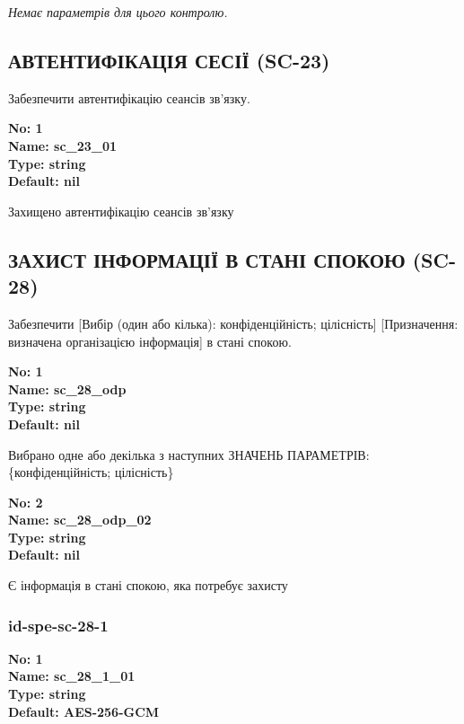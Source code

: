 \documentclass{article}
\begin{document}
\vspace{10pt}
\textit{Немає параметрів для цього контролю.}
\vspace{10pt}


\subsection{АВТЕНТИФІКАЦІЯ СЕСІЇ (SC-23)}
Забезпечити автентифікацію сеансів зв'язку.

\vspace{10pt}
{\footnotesize\bfseries
No: 1\\
Name: sc\_\allowbreak{}23\_\allowbreak{}01\\
Type: string\\
Default: nil
}

{\footnotesize Захищено автентифікацію сеансів зв'язку}




\subsection{ЗАХИСТ ІНФОРМАЦІЇ В СТАНІ СПОКОЮ (SC-28)}
Забезпечити [Вибір (один або кілька): конфіденційність; цілісність] [Призначення: визначена організацією інформація] в стані спокою.

\vspace{10pt}
{\footnotesize\bfseries
No: 1\\
Name: sc\_\allowbreak{}28\_\allowbreak{}odp\\
Type: string\\
Default: nil
}

{\footnotesize Вибрано одне або декілька з наступних ЗНАЧЕНЬ ПАРАМЕТРІВ: \{конфіденційність; цілісність\}}


{\footnotesize\bfseries
No: 2\\
Name: sc\_\allowbreak{}28\_\allowbreak{}odp\_\allowbreak{}02\\
Type: string\\
Default: nil
}

{\footnotesize Є інформація в стані спокою, яка потребує захисту}




\subsubsection{id-spe-sc-28-1}


\vspace{10pt}
{\footnotesize\bfseries
No: 1\\
Name: sc\_\allowbreak{}28\_\allowbreak{}1\_\allowbreak{}01\\
Type: string\\
Default: \textquotedbl{}AES-256-GCM\textquotedbl{}
}
\end{document}
